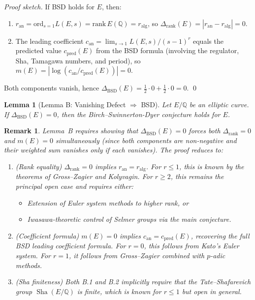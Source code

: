 \documentclass[11pt]{article}
\newtheorem{lemma}[theorem]{Lemma}
\newtheorem{remark}[theorem]{Remark}
\DeclareMathOperator{\Sha}{Sha}
\begin{document}
\begin{proof}[Proof sketch]
If BSD holds for $E$, then:
\begin{enumerate}
  \item $r_{\mathrm{an}} = \mathrm{ord}_{s=1} L(E,s) = \mathrm{rank}\, E(\mathbb{Q}) = r_{\mathrm{alg}}$, so $\Delta_{\mathrm{rank}}(E) = |r_{\mathrm{an}} - r_{\mathrm{alg}}| = 0$.
  \item The leading coefficient $c_{\mathrm{an}} = \lim_{s \to 1} L(E,s)/(s-1)^{r}$ equals the predicted value $c_{\mathrm{pred}}(E)$ from the BSD formula (involving the regulator, Sha, Tamagawa numbers, and period), so $m(E) = |\log(c_{\mathrm{an}}/c_{\mathrm{pred}}(E))| = 0$.
\end{enumerate}
Both components vanish, hence $\Delta_{\mathrm{BSD}}(E) = \tfrac{1}{2} \cdot 0 + \tfrac{1}{2} \cdot 0 = 0$. \qed
\end{proof}

\begin{lemma}[Lemma B: Vanishing Defect $\Rightarrow$ BSD]
\label{lem:bsd-B}
Let $E/\mathbb{Q}$ be an elliptic curve. If $\Delta_{\mathrm{BSD}}(E) = 0$, then the Birch--Swinnerton-Dyer conjecture holds for $E$.
\end{lemma}

\begin{remark}
Lemma~B requires showing that $\Delta_{\mathrm{BSD}}(E) = 0$ forces both $\Delta_{\mathrm{rank}} = 0$ and $m(E) = 0$ simultaneously (since both components are non-negative and their weighted sum vanishes only if each vanishes). The proof reduces to:
\begin{enumerate}
  \item[\textbf{B.1}] \emph{(Rank equality)} $\Delta_{\mathrm{rank}} = 0$ implies $r_{\mathrm{an}} = r_{\mathrm{alg}}$. For $r \leq 1$, this is known by the theorems of Gross--Zagier and Kolyvagin. For $r \geq 2$, this remains the principal open case and requires either:
    \begin{itemize}
      \item Extension of Euler system methods to higher rank, or
      \item Iwasawa-theoretic control of Selmer groups via the main conjecture.
    \end{itemize}
  \item[\textbf{B.2}] \emph{(Coefficient formula)} $m(E) = 0$ implies $c_{\mathrm{an}} = c_{\mathrm{pred}}(E)$, recovering the full BSD leading coefficient formula. For $r = 0$, this follows from Kato's Euler system. For $r = 1$, it follows from Gross--Zagier combined with $p$-adic methods.
  \item[\textbf{B.3}] \emph{(Sha finiteness)} Both B.1 and B.2 implicitly require that the Tate--Shafarevich group $\Sha(E/\mathbb{Q})$ is finite, which is known for $r \leq 1$ but open in general.
\end{enumerate}
\end{remark}
\end{document}
